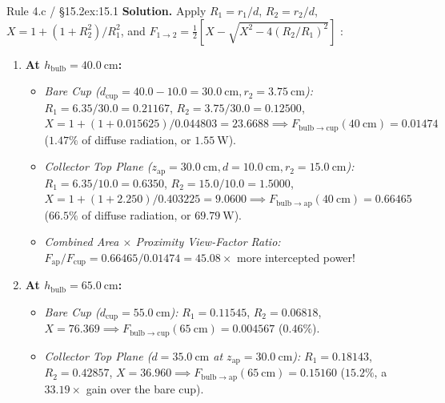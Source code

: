 \begin{workedexample}{Rule 4.c / §15.2}{ex:15.1}
\textbf{Solution.} Apply $R_1 = r_1/d$, $R_2 = r_2/d$, $X = 1 + (1+R_2^2)/R_1^2$, and $F_{1\to 2} = \frac{1}{2}[X - \sqrt{X^2 - 4(R_2/R_1)^2}]$ :
\begin{enumerate}
  \item \textbf{At $h_{\mathrm{bulb}} = \SI{40.0}{\centi\meter}$:}
    \begin{itemize}
      \item \textit{Bare Cup ($d_{\mathrm{cup}} = 40.0 - 10.0 = \SI{30.0}{\centi\meter}, r_2 = \SI{3.75}{\centi\meter}$):} $R_1 = 6.35/30.0 = 0.21167$, $R_2 = 3.75/30.0 = 0.12500$, $X = 1 + (1 + 0.015625)/0.044803 = 23.6688 \implies F_{\mathrm{bulb}\to\mathrm{cup}}(\SI{40}{\centi\meter}) = \mathbf{0.01474}$ ($1.47\%$ of diffuse radiation, or $\SI{1.55}{\watt}$).
      \item \textit{Collector Top Plane ($z_{\mathrm{ap}} = \SI{30.0}{\centi\meter}, d = \SI{10.0}{\centi\meter}, r_2 = \SI{15.0}{\centi\meter}$):} $R_1 = 6.35/10.0 = 0.6350$, $R_2 = 15.0/10.0 = 1.5000$, $X = 1 + (1 + 2.250)/0.403225 = 9.0600 \implies F_{\mathrm{bulb}\to\mathrm{ap}}(\SI{40}{\centi\meter}) = \mathbf{0.66465}$ ($66.5\%$ of diffuse radiation, or $\SI{69.79}{\watt}$).
      \item \textit{Combined Area $\times$ Proximity View-Factor Ratio:} $F_{\mathrm{ap}}/F_{\mathrm{cup}} = 0.66465 / 0.01474 = \mathbf{45.08\times}$ more intercepted power!
    \end{itemize}
  \item \textbf{At $h_{\mathrm{bulb}} = \SI{65.0}{\centi\meter}$:}
    \begin{itemize}
      \item \textit{Bare Cup ($d_{\mathrm{cup}} = \SI{55.0}{\centi\meter}$):} $R_1 = 0.11545$, $R_2 = 0.06818$, $X = 76.369 \implies F_{\mathrm{bulb}\to\mathrm{cup}}(\SI{65}{\centi\meter}) = \mathbf{0.004567}$ ($0.46\%$).
      \item \textit{Collector Top Plane ($d = \SI{35.0}{\centi\meter}$ at $z_{\mathrm{ap}}=\SI{30.0}{\centi\meter}$):} $R_1 = 0.18143$, $R_2 = 0.42857$, $X = 36.960 \implies F_{\mathrm{bulb}\to\mathrm{ap}}(\SI{65}{\centi\meter}) = \mathbf{0.15160}$ ($15.2\%$, a $\mathbf{33.19\times}$ gain over the bare cup).
    \end{itemize}
\end{enumerate}
\end{workedexample}

